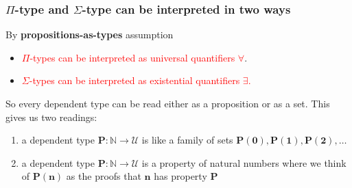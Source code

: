 \begin{frame}
\frametitle{$\Pi$-type and $\Sigma$-type can be interpreted in two ways}
By \textbf{propositions-as-types} assumption
\begin{itemize}
	\item \textcolor{red}{$\Pi$-types can be interpreted as universal quantifiers $\forall$}.
	\item \textcolor{red}{$\Sigma$-types can be interpreted as existential quantifiers $\exists$.}
\end{itemize}
So every dependent type can be read either as a proposition or as a set. This gives us two readings:
\begin{enumerate}
	\item
	a dependent type $\pmb{P:\mathbb{N} \rightarrow \mathcal{U}}$ is like a family of sets $\pmb{P(0), P(1), P(2), \ldots}$
	\item
	a dependent type $\pmb{P:\mathbb{N} \rightarrow \mathcal{U}}$ is a property of natural numbers where we think of $\pmb{P(n)}$ as the proofs that $\pmb{n}$ has property $\pmb{P}$
\end{enumerate}
\end{frame}

